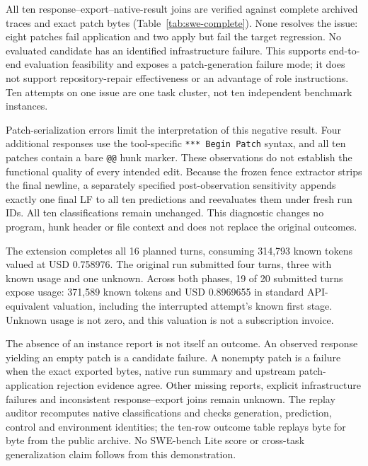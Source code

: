 All ten response--export--native-result joins are verified against complete archived traces and exact patch bytes (Table~\ref{tab:swe-complete}). None resolves the issue: eight patches fail application and two apply but fail the target regression. No evaluated candidate has an identified infrastructure failure. This supports end-to-end evaluation feasibility and exposes a patch-generation failure mode; it does not support repository-repair effectiveness or an advantage of role instructions. Ten attempts on one issue are one task cluster, not ten independent benchmark instances.

Patch-serialization errors limit the interpretation of this negative result. Four additional responses use the tool-specific \texttt{*** Begin Patch} syntax, and all ten patches contain a bare \texttt{@@} hunk marker. These observations do not establish the functional quality of every intended edit. Because the frozen fence extractor strips the final newline, a separately specified post-observation sensitivity appends exactly one final LF to all ten predictions and reevaluates them under fresh run IDs. All ten classifications remain unchanged. This diagnostic changes no program, hunk header or file context and does not replace the original outcomes.

The extension completes all 16 planned turns, consuming 314,793 known tokens valued at USD 0.758976. The original run submitted four turns, three with known usage and one unknown. Across both phases, 19 of 20 submitted turns expose usage: 371,589 known tokens and USD 0.8969655 in standard API-equivalent valuation, including the interrupted attempt's known first stage. Unknown usage is not zero, and this valuation is not a subscription invoice.

The absence of an instance report is not itself an outcome. An observed response yielding an empty patch is a candidate failure. A nonempty patch is a failure when the exact exported bytes, native run summary and upstream patch-application rejection evidence agree. Other missing reports, explicit infrastructure failures and inconsistent response--export joins remain unknown. The replay auditor recomputes native classifications and checks generation, prediction, control and environment identities; the ten-row outcome table replays byte for byte from the public archive. No SWE-bench Lite score or cross-task generalization claim follows from this demonstration.

